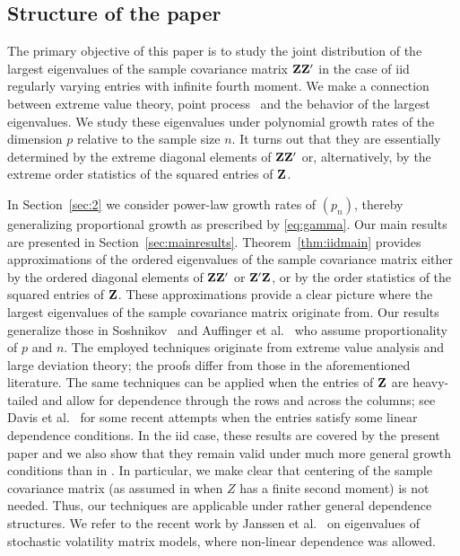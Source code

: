 \subsection{Structure of the paper}
The primary objective of this paper is to study the joint distribution of the largest eigenvalues of the sample covariance matrix ${\mathbf Z}{\mathbf Z}'$
in the case of iid regularly varying entries with infinite fourth moment.
We make a connection between extreme value theory, point process \con\ and the behavior of the largest eigenvalues. 
We study these eigenvalues under polynomial 
growth rates of the dimension $p$ relative to the sample size $n$. 
It turns out that they are essentially determined by the extreme diagonal elements of ${\mathbf Z}{\mathbf Z}'$ or, alternatively, 
by the extreme order statistics of the squared entries of ${\mathbf Z}$.  
\par
In Section~\ref{sec:2} we consider power-law growth rates of $(p_n)$, 
thereby generalizing proportional growth as prescribed by \eqref{eq:gamma}.
Our main results are presented in Section~\ref{sec:mainresults}. 
Theorem~\ref{thm:iidmain} provides approximations of the ordered eigenvalues of the sample covariance matrix either by
the ordered diagonal elements of ${\mathbf Z}{\mathbf Z}'$ or ${\mathbf Z}'{\mathbf Z}$, or by the order statistics of the squared entries of ${\mathbf Z}$.
These approximations provide a clear picture where the largest eigenvalues of the sample covariance matrix originate from. 
Our results generalize those in Soshnikov~\cite{soshnikov:2004,soshnikov:2006} and 
Auffinger et al.~\cite{auffinger:arous:peche:2009} who assume proportionality of $p$ and $n$.
The employed techniques originate from extreme value analysis and large deviation theory; the proofs differ from those 
in the aforementioned literature. 
The same techniques can be applied when the entries of ${\mathbf Z}$ 
are heavy-tailed and allow for dependence through the rows and across the columns; see 
Davis et al.~\cite{davis:mikosch:pfaffel:2015,davis:pfaffel:stelzer:2014} for some recent attempts 
when the entries satisfy some linear dependence conditions. In the iid case, these results are covered by the present paper
and we also show that they remain valid under much more general growth conditions than in \cite{davis:mikosch:pfaffel:2015,davis:pfaffel:stelzer:2014}. In particular, we make clear that centering of the sample covariance matrix (as assumed in 
\cite{davis:mikosch:pfaffel:2015,davis:pfaffel:stelzer:2014} when $Z$ has a finite second moment) is not needed. Thus, our techniques are applicable under rather general dependence structures. We refer to the recent work by Janssen et al.~\cite{janssen:mikosch:rezapour:xie:2016} on eigenvalues of stochastic volatility matrix models, where non-linear dependence was allowed.


